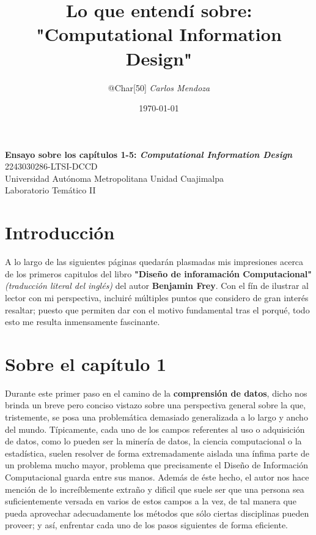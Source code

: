 \documentclass[11pt, letterpaper]{article}
\title{\textbf{Lo que entendí sobre: "Computational Information Design"}}
\author{@Char[50] \textit{Carlos Mendoza}}
\date{\today}
\newcommand{\iniciarconteo}{\directlua{start_counting()}}
\begin{document}
\begin{titlepage} 
    \centering
    \vspace*{2cm}
    {\LARGE \textbf{Ensayo sobre los capítulos 1-5: \textit{Computational Information Design}}} \\[2cm]
    {\large 2243030286-LTSI-DCCD} \\[1cm]
    {\large Universidad Autónoma Metropolitana Unidad Cuajimalpa} \\
    {\large Laboratorio Temático II} \\[2cm]
\end{titlepage}
\newpage

\maketitle %
\tableofcontents

\newpage
\section{Introducción}
A lo largo de las siguientes páginas quedarán plasmadas mis impresiones acerca de los primeros capitulos del libro \textbf{"Diseño de inforamación Computacional"} \textit{(traducción literal del inglés)} del autor \textbf{Benjamin Frey}. Con el fín de ilustrar al lector con mi perspectiva, incluiré múltiples puntos que considero de gran interés resaltar; puesto que permiten dar con el motivo fundamental tras el porqué, todo esto me resulta inmensamente fascinante.   

\iniciarconteo
\newpage
\section{Sobre el capítulo 1}
Durante este primer paso en el camino de la \textbf{comprensión de datos}, dicho nos brinda un breve pero conciso vistazo sobre una perspectiva general sobre la que, tristemente, se posa una problemática demasiado generalizada a lo largo y ancho del mundo. Típicamente, cada uno de los campos referentes al uso o adquisición de datos, como lo pueden ser la minería de datos, la ciencia computacional o la estadística, suelen resolver de forma extremadamente aislada una ínfima parte de un problema mucho mayor, problema que precisamente el Diseño de Información Computacional guarda entre sus manos. Además de éste hecho, el autor nos hace mención de lo increíblemente extraño y dificil que suele ser que una persona sea suficientemente versada en varios de estos campos a la vez, de tal manera que pueda aprovechar adecuadamente los métodos que sólo ciertas disciplinas pueden proveer; y así, enfrentar cada uno de los pasos siguientes de forma eficiente. 
\end{document}
